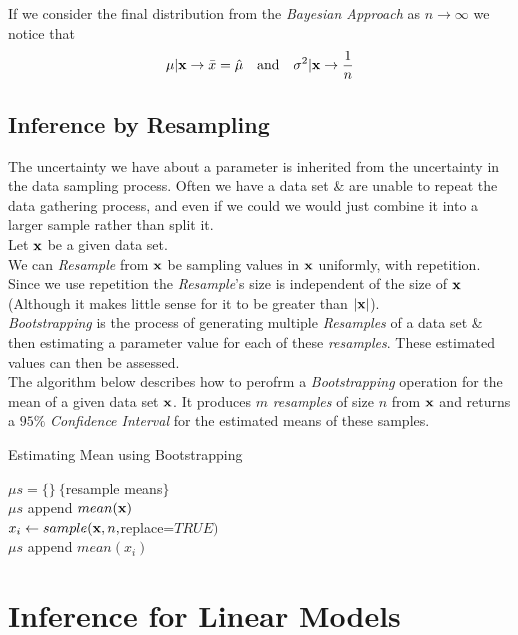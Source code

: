 \documentclass[11pt,a4paper]{article}
\begin{document}
If we consider the final distribution from the \textit{Bayesian Approach} as $n\to\infty$ we notice that
$$\mu|\textbf{x}\to\bar{x}=\hat\mu\quad\text{and}\quad\sigma^2|\textbf{x}\to\frac1n$$

\subsection{Inference by Resampling}

The uncertainty we have about a parameter is inherited from the uncertainty in the data sampling process. Often we have a data set \& are unable to repeat the data gathering process, and even if we could we would just combine it into a larger sample rather than split it.\\

Let $\textbf{x}$ be a given data set.\\
We can \textit{Resample} from $\textbf{x}$ be sampling values in $\textbf{x}$ uniformly, with repetition. Since we use repetition the \textit{Resample}'s size is independent of the size of $\textbf{x}$ (Although it makes little sense for it to be greater than $|\textbf{x}|$).\\

\textit{Bootstrapping} is the process of generating multiple \textit{Resamples} of a data set \& then estimating a parameter value for each of these \textit{resamples}. These estimated values can then be assessed.\\

The algorithm below describes how to perofrm a \textit{Bootstrapping} operation for the mean of a given data set $\textbf{x}$. It produces $m$ \textit{resamples} of size $n$ from $\textbf{x}$ and returns a $95\%$ \textit{Confidence Interval} for the estimated means of these samples.\\
\begin{algorithm}[H]
\caption{Estimating Mean using Bootstrapping}
$\mu s=\{\}\ \{$resample means$\}$\\
$\mu s$ append $mean(\textbf{x})$\\
 {
$x_i\leftarrow sample(\textbf{x},n,$replace=$TRUE)$\\
$\mu s$ append $mean(x_i)$
}
\end{algorithm}

\section{Inference for Linear Models}
\end{document}
